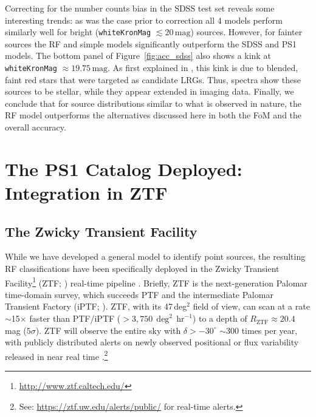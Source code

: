 \documentclass[twocolumn, dvipdfmx]{aastex62}
\begin{document}
\begin{CJK*}{UTF8}{gbsn}
Correcting for the number counts bias in the SDSS test set reveals some
interesting trends: as was the case prior to correction all 4 models perform
similarly well for bright (\texttt{whiteKronMag} $\lesssim
20\,\mathrm{mag}$) sources. However, for fainter sources the RF and simple
models significantly outperform the SDSS and PS1 models. The bottom panel of
Figure~\ref{fig:acc_sdss} also shows a kink at \texttt{whiteKronMag}
$\approx 19.75\,\mathrm{mag}$. As first explained in \citet{Miller17}, this
kink is due to blended, faint red stars that were targeted as candidate
LRGs. Thus, spectra show these sources to be stellar, while they appear
extended in imaging data. Finally, we conclude that for source distributions
similar to what is observed in nature, the RF model outperforms the
alternatives discussed here in both the FoM and the overall accuracy.


\section{The PS1 Catalog Deployed: Integration in ZTF}
\label{sec:ztf}

\subsection{The Zwicky Transient Facility}

While we have developed a general model to identify point sources, the
resulting RF classifications have been specifically deployed in the Zwicky
Transient Facility\footnote{\url{http://www.ztf.caltech.edu/}} (ZTF;
\citealt{Bellm:18:ZTF, Dekany:18:ZTF}) real-time pipeline
\citep{Masci:18:ZTF}. Briefly, ZTF is the next-generation Palomar
time-domain survey, which succeeds PTF \citep{Rau09, Law09} and the
intermediate Palomar Transient Factory (iPTF; \citealt{Kulkarni13}). ZTF,
with its 47\,deg$^2$ field of view, can scan at a rate $\sim$15$\times$
faster than PTF/iPTF ($>3{,}750\,\deg^2\,\mathrm{hr}^{-1}$) to a depth of
$R_\mathrm{ZTF} \approx 20.4$\,mag ($5\sigma$). ZTF will observe the entire
sky with $\delta > -30^{\circ}$ $\sim$300 times per year, with publicly
distributed alerts on newly observed positional or flux variability released
in near real time \citep{Patterson:18:ZTF}.\footnote{See: \url{https://ztf.uw.edu/alerts/public/} for real-time alerts.}


\end{CJK*}
\end{document}

